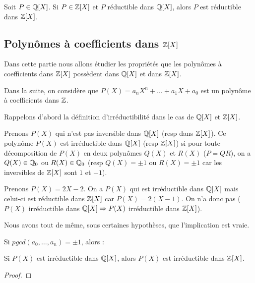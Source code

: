 \begin{remarque}
	Soit $P \in \mathbb{Q}[X]$.
	Si $P \in \mathbb{Z}[X]$ et $P$ réductible dans $\mathbb{Q}[X]$, alors $P$ est
	réductible dans $\mathbb{Z}[X]$.
\end{remarque}

\subsection{Polynômes à coefficients dans $\mathbb{Z}[X]$}

Dans cette partie nous allons étudier les propriétés que les polynômes à
coefficients dans $\mathbb{Z}[X]$ possèdent dans $\mathbb{Q}[X]$ et dans
$\mathbb{Z}[X]$.


Dans la suite, on considère que $P(X) = a_{n}X^{n} + \ldots + a_{1}X + a_{0}$
est un polynôme à coefficients dans $\mathbb{Z}$.

Rappelons d'abord la définition d'irréductibilité dans le cas de $\mathbb{Q}[X]$
et $\mathbb{Z}[X]$.

Prenons $P(X)$ qui n'est pas inversible dans $\mathbb{Q}[X]$ (resp dans
$\mathbb{Z}[X]$).
Ce polynôme $P(X)$ est irréductible dans $\mathbb{Q}[X]$ (resp $\mathbb{Z}[X]$) si
pour toute décomposition de $P(X)$ en deux polynômes $Q(X)$ et $R(X)$ ($P =
QR$), on a $Q(X) \in \mathbb{Q}_{0}$ ou $R(X) \in \mathbb{Q}_{0}$ (resp $Q(X) = \pm 1$
ou $R(X) = \pm 1$ car les inversibles de $\mathbb{Z}[X]$ sont $1$ et $-1$).

Prenons $P(X) = 2X-2$. On a $P(X)$ qui est irréductible dans
$\mathbb{Q}[X]$ mais celui-ci est réductible dans $\mathbb{Z}[X]$ car $P(X) =
2(X-1)$. On n'a donc pas ($P(X)$ irréductible dans $\mathbb{Q}[X] \Rightarrow
P(X)$ irréductible dans $\mathbb{Z}[X]$).

Nous avons tout de même, sous certaines hypothèses, que l'implication est vraie.

\begin{proposition}
	Si $pgcd(a_{0}, \ldots, a_{n}) = \pm 1$, alors :

	Si $P(X)$ est irréductible dans $\mathbb{Q}[X]$, alors $P(X)$ est
	irréductible dans $\mathbb{Z}[X]$.
\end{proposition}

\ifdefined\outputproof
\begin{proof}

\end{proof}
\fi

